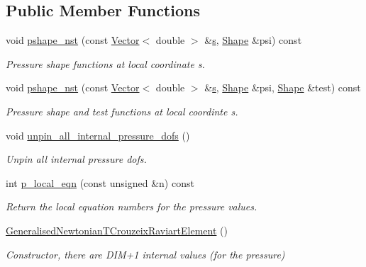 \subsection*{Public Member Functions}
\begin{DoxyCompactItemize}
\item 
void \hyperlink{classoomph_1_1GeneralisedNewtonianTCrouzeixRaviartElement_aa5b24d0755232d850281523741ea7f1b}{pshape\+\_\+nst} (const \hyperlink{classoomph_1_1Vector}{Vector}$<$ double $>$ \&\hyperlink{cfortran_8h_ab7123126e4885ef647dd9c6e3807a21c}{s}, \hyperlink{classoomph_1_1Shape}{Shape} \&psi) const
\begin{DoxyCompactList}\small\item\em Pressure shape functions at local coordinate s. \end{DoxyCompactList}\item 
void \hyperlink{classoomph_1_1GeneralisedNewtonianTCrouzeixRaviartElement_aa63eaa8f55cb948e2916e869aa735a21}{pshape\+\_\+nst} (const \hyperlink{classoomph_1_1Vector}{Vector}$<$ double $>$ \&\hyperlink{cfortran_8h_ab7123126e4885ef647dd9c6e3807a21c}{s}, \hyperlink{classoomph_1_1Shape}{Shape} \&psi, \hyperlink{classoomph_1_1Shape}{Shape} \&test) const
\begin{DoxyCompactList}\small\item\em Pressure shape and test functions at local coordinte s. \end{DoxyCompactList}\item 
void \hyperlink{classoomph_1_1GeneralisedNewtonianTCrouzeixRaviartElement_abca9c6b5ec64285b34410a5160291a9f}{unpin\+\_\+all\+\_\+internal\+\_\+pressure\+\_\+dofs} ()
\begin{DoxyCompactList}\small\item\em Unpin all internal pressure dofs. \end{DoxyCompactList}\item 
int \hyperlink{classoomph_1_1GeneralisedNewtonianTCrouzeixRaviartElement_a8c03ca5840d0f0da302bea52518744d9}{p\+\_\+local\+\_\+eqn} (const unsigned \&n) const
\begin{DoxyCompactList}\small\item\em Return the local equation numbers for the pressure values. \end{DoxyCompactList}\item 
\hyperlink{classoomph_1_1GeneralisedNewtonianTCrouzeixRaviartElement_ad69c2f4ea7c8eb81dfc5bce1bb709092}{Generalised\+Newtonian\+T\+Crouzeix\+Raviart\+Element} ()
\begin{DoxyCompactList}\small\item\em Constructor, there are D\+I\+M+1 internal values (for the pressure) \end{DoxyCompactList}\item 

\end{DoxyCompactItemize}
